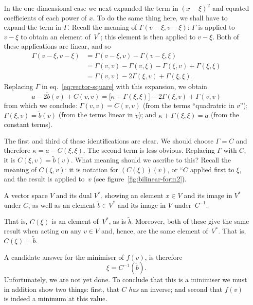\documentclass[10pt, a4paper]{article}
\begin{document}
In the one-dimensional case we next expanded the term in ${(x-\xi)}^2$
and equated coefficients of each power of $x$. To do the same thing
here, we shall have to expand the term in $\Gamma$. Recall the meaning of
$\Gamma(v-\xi, v-\xi)$: $\Gamma$ is applied to $v-\xi$ to obtain an element
of~$V^*$; this element is then applied to $v-\xi$. Both of these
applications are linear, and so
\[
  \begin{aligned}
  \Gamma(v-\xi,v-\xi) & = \Gamma(v-\xi,v)-\Gamma(v-\xi, \xi) \\
  & = \Gamma(v,v)-\Gamma(v, \xi) - \Gamma(\xi,v) + \Gamma(\xi, \xi) \\
  & = \Gamma(v,v)-2\Gamma(\xi,v)+\Gamma(\xi,\xi).
  \end{aligned}
\]
Replacing $\Gamma$ in eq.~\eqref{eq:vector-square} with this expansion, we
obtain
\[
  a -2\tilde{b}(v)+C(v,v) = \bigl[\kappa+\Gamma(\xi,\xi)\bigr] -2\Gamma(\xi,v) + \Gamma(v,v)
\]
from which we conclude: $\Gamma(v,v) = C(v,v)$ (from the
terms “quadratric in $v$”); $\Gamma(\xi, v) = \tilde{b}(v)$ (from the terms
linear in $v$); and $\kappa+\Gamma(\xi,\xi)=a$ (from the constant terms).

The first and third of these identifications are clear. We should
choose $\Gamma=C$ and therefore $\kappa=a-C(\xi,\xi)$. The second term is less
obvious. Replacing $\Gamma$ with $C$, it is
$C(\xi, v) = \tilde{b}(v)$. What meaning should we ascribe to this?
Recall the meaning of $C(\xi,v)$: it is notation for $(C(\xi))(v)$, or
“$C$ applied first to $\xi$, and the result is applied to~$v$ (see
figure~\ref{fig:bilinear-form2}).
\begin{marginfigure}
  \begin{center}
  \end{center}
\caption{A vector space $V$ and its dual $V^*$, showing an element $x\in
  V$ and its image in $V^*$ under $C$, as well as an element
  $\tilde{b}\in V^*$ and its image in $V$ under~$C^{-1}$.\label{fig:bilinear-form2}}
\end{marginfigure}
That is, $C(\xi)$ is an element of~$V^*$, as is $\tilde{b}$. Moreover,
both of these give the same result when acting on any $v\in V$ and,
hence, are the same element of~$V^*$. That is, $C(\xi) = \tilde{b}$. 

A candidate answer for the minimiser of $f(v)$, is therefore
\begin{equation}
  \label{eq:minimiser}
  \xi = C^{-1}(\tilde{b}).
\end{equation}
Unfortunately, we are not yet done. To conclude that this is a
minimiser we must in addition show two things: first, that $C$
\emph{has} an inverse; and second that $f(v)$ is indeed a minimum at
this value.
\end{document}
